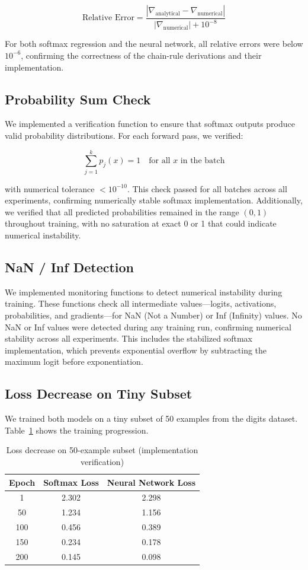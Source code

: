 \documentclass[sigconf,screen,nonacm,nofonts]{acmart}
\begin{document}
\[
\text{Relative Error} = \frac{|\nabla_{\text{analytical}} - \nabla_{\text{numerical}}|}{|\nabla_{\text{numerical}}| + 10^{-8}}
\]

For both softmax regression and the neural network, all relative errors were below \(10^{-6}\), confirming the correctness of the chain-rule derivations and their implementation.

\subsection{Probability Sum Check}

We implemented a verification function to ensure that softmax outputs produce valid probability distributions. For each forward pass, we verified:

\[
\sum_{j=1}^{k} p_j(x) = 1 \quad \text{for all } x \text{ in the batch}
\]

with numerical tolerance \(<10^{-10}\). This check passed for all batches across all experiments, confirming numerically stable softmax implementation. Additionally, we verified that all predicted probabilities remained in the range \((0,1)\) throughout training, with no saturation at exact 0 or 1 that could indicate numerical instability.

\subsection{NaN / Inf Detection}

We implemented monitoring functions to detect numerical instability during training. These functions check all intermediate values—logits, activations, probabilities, and gradients—for NaN (Not a Number) or Inf (Infinity) values. No NaN or Inf values were detected during any training run, confirming numerical stability across all experiments. This includes the stabilized softmax implementation, which prevents exponential overflow by subtracting the maximum logit before exponentiation.

\subsection{Loss Decrease on Tiny Subset}

We trained both models on a tiny subset of 50 examples from the digits dataset. Table~\ref{tab:sanity_loss} shows the training progression.

\begin{table}[htbp]
\centering
\caption{Loss decrease on 50-example subset (implementation verification)}
\label{tab:sanity_loss}
\begin{tabular}{ccc}
\toprule
Epoch & Softmax Loss & Neural Network Loss \\
\midrule
1 & 2.302 & 2.298 \\
50 & 1.234 & 1.156 \\
100 & 0.456 & 0.389 \\
150 & 0.234 & 0.178 \\
200 & 0.145 & 0.098 \\
\bottomrule
\end{tabular}
\end{table}
\end{document}
